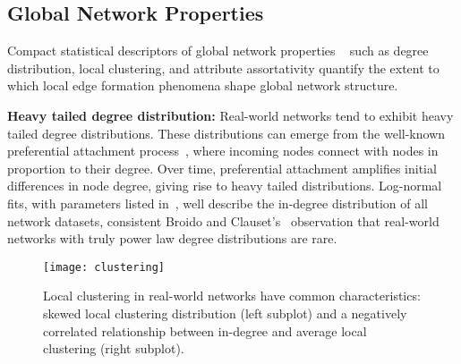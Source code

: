 %


\subsection{Global Network Properties}
\label{subsec:factors}

Compact statistical descriptors of global network properties ~\cite{newman2010networks}
such as degree distribution, local clustering, and attribute assortativity
quantify the extent to which local edge formation phenomena shape global network
structure.

\textbf{Heavy tailed degree distribution:}
Real-world networks tend to exhibit heavy tailed degree distributions.
These distributions can emerge from the well-known preferential attachment
process~\cite{simon1955class,barabasi1999emergence}, where incoming nodes
connect with nodes in proportion to their degree. Over time, preferential
attachment amplifies initial differences in node degree, giving rise to heavy tailed
distributions.
Log-normal fits, with parameters listed in~, well describe
the in-degree distribution of all network datasets, consistent Broido and
Clauset's~\cite{broido2018scale} observation that real-world networks with truly
power law degree distributions are rare.

\begin{figure}[H]
 \vspace{-10pt}
 \centering
 \texttt{[image: clustering]}
 \caption{
    Local clustering in real-world networks have common characteristics:
    skewed local clustering distribution (left subplot) and a negatively correlated
    relationship between in-degree and average local clustering (right subplot).
 }
 \label{fig:cc_dc}
 \vspace{-10pt}
\end{figure}

